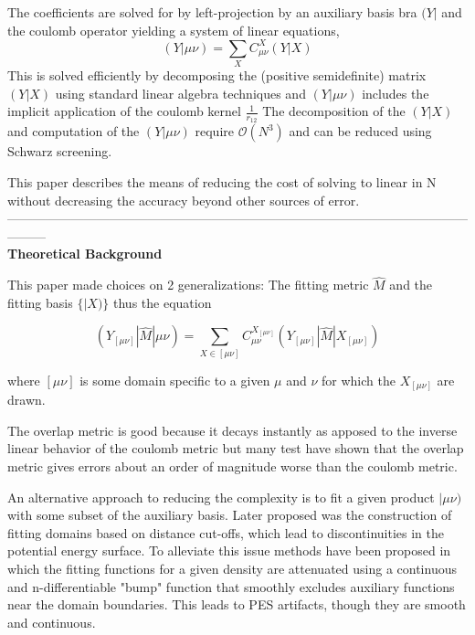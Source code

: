 \documentclass[10pt, draft]{article}
\begin{document}
 The coefficients are solved for by left-projection by an auxiliary basis bra $(Y|$ and the coulomb operator yielding a system of linear equations,
 \[(Y|\mu\nu) = \sum_X C^X_{\mu\nu} (Y|X)\]
 This is solved efficiently by decomposing the (positive semidefinite) matrix $(Y|X)$ using standard linear algebra techniques and $(Y|\mu\nu)$ includes the implicit application of the coulomb kernel $\frac{1}{r_{12}}$ \linebreak[1]
 The decomposition of the $(Y|X)$ and computation of the $(Y|\mu\nu)$ require $\mathcal{O}(N^3)$ and can be reduced using Schwarz screening.  \linebreak[1]
 
 This paper describes the means of reducing the cost of solving to linear in N without decreasing the accuracy beyond other sources of error.  
 \\ ---------------------------------------------------------------------------------------------------------------------\\

 \textbf{Theoretical Background}\linebreak[2]
 
 This paper made choices on 2 generalizations: The fitting metric $\hat{M}$ and the fitting basis $\{|X)\}$ thus the equation
 
 \[(Y_{[\mu\nu]} | \hat{M} | \mu\nu) = \sum_{X\in [\mu\nu]} C^{X_{[\mu\nu]}}_{\mu\nu} (Y_{[\mu\nu]}|\hat{M}|X_{[\mu\nu]})\]
 
 where $[\mu\nu]$ is some domain specific to a given $\mu$ and $\nu$ for which the $X_{[\mu\nu]}$ are drawn.  \linebreak[1]
 
 The overlap metric is good because it decays instantly as apposed to the inverse linear behavior of the coulomb metric but many test have shown that the overlap metric gives errors about an order of magnitude worse than the coulomb metric. \linebreak[1]
 
 An alternative approach to reducing the complexity is to fit a given product $|\mu\nu)$ with some subset of the auxiliary basis.  Later proposed was the construction of fitting domains based on distance cut-offs, which lead to discontinuities in the potential energy surface.   To alleviate this issue methods have been proposed in which the fitting functions for a given density are attenuated using a continuous and n-differentiable "bump" function that smoothly excludes auxiliary functions near the domain boundaries.  This leads to PES artifacts, though they are smooth and continuous.\linebreak[1]
  
\end{document}
